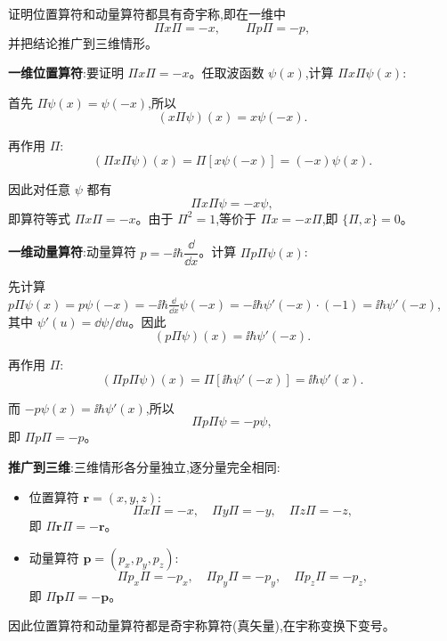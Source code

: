\begin{question}
证明位置算符和动量算符都具有奇宇称,即在一维中
\[
\Pi x\Pi=-x,
\qquad
\Pi p\Pi=-p,
\]
并把结论推广到三维情形。
\end{question}
\begin{solution}
	\textbf{一维位置算符}:要证明 $\Pi x\Pi = -x$。任取波函数 $\psi(x)$,计算 $\Pi x\Pi\psi(x)$:

	首先 $\Pi\psi(x)=\psi(-x)$,所以
	\[
	(x\Pi\psi)(x)=x\psi(-x).
	\]

	再作用 $\Pi$:
	\[
	(\Pi x\Pi\psi)(x)=\Pi[x\psi(-x)]=(-x)\psi(x).
	\]

	因此对任意 $\psi$ 都有
	\[
	\Pi x\Pi\psi = -x\psi,
	\]
	即算符等式 $\boxed{\Pi x\Pi = -x}$。由于 $\Pi^2=1$,等价于 $\Pi x = -x\Pi$,即 $\{\Pi,x\}=0$。

	\textbf{一维动量算符}:动量算符 $p = -\ii\hbar\dfrac{\dd}{\dd x}$。计算 $\Pi p\Pi\psi(x)$:

	先计算 $p\Pi\psi(x)=p\psi(-x)=-\ii\hbar\frac{\dd}{\dd x}\psi(-x)=-\ii\hbar\psi'(-x)\cdot(-1)=\ii\hbar\psi'(-x)$,
	其中 $\psi'(u)=\dd\psi/\dd u$。因此
	\[
	(p\Pi\psi)(x)=\ii\hbar\psi'(-x).
	\]

	再作用 $\Pi$:
	\[
	(\Pi p\Pi\psi)(x)=\Pi[\ii\hbar\psi'(-x)]=\ii\hbar\psi'(x).
	\]

	而 $-p\psi(x)=\ii\hbar\psi'(x)$,所以
	\[
	\Pi p\Pi\psi = -p\psi,
	\]
	即 $\boxed{\Pi p\Pi = -p}$。

	\textbf{推广到三维}:三维情形各分量独立,逐分量完全相同:
	\begin{itemize}
	\item 位置算符 $\mathbf r=(x,y,z)$:
	\[
	\Pi x\Pi = -x,\quad \Pi y\Pi = -y,\quad \Pi z\Pi = -z,
	\]
	即 $\boxed{\Pi\mathbf r\Pi = -\mathbf r}$。
	\item 动量算符 $\mathbf p=(p_x,p_y,p_z)$:
	\[
	\Pi p_x\Pi = -p_x,\quad \Pi p_y\Pi = -p_y,\quad \Pi p_z\Pi = -p_z,
	\]
	即 $\boxed{\Pi\mathbf p\Pi = -\mathbf p}$。
	\end{itemize}

	因此位置算符和动量算符都是奇宇称算符(真矢量),在宇称变换下变号。
	\end{solution}

